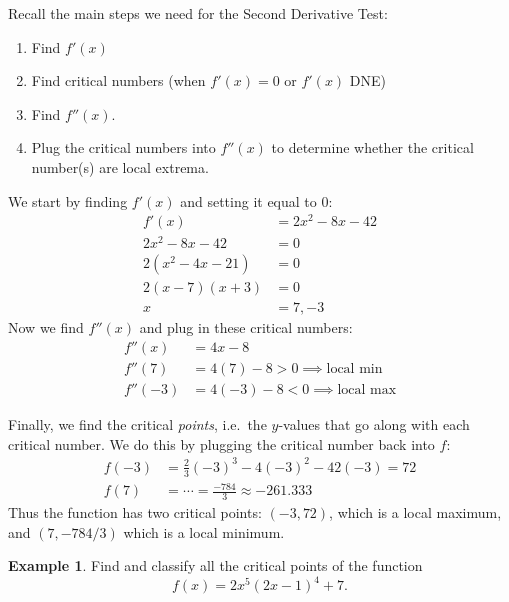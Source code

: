 \documentclass[oneside]{book}
\theoremstyle{definition}
\newtheorem{example}{Example}
\theoremstyle{solution}
\newtheorem*{solution}{Solution}
\newenvironment{solution}{\vspace{2in}\comment}{\endcomment}
\begin{document}
\begin{solution}
Recall the main steps we need for the Second Derivative Test:
\begin{enumerate}
\item Find $f'(x)$
\item Find critical numbers (when $f'(x) = 0$ or $f'(x)$ DNE)
\item Find $f''(x)$.
\item Plug the critical numbers into $f''(x)$ to determine whether the
  critical number(s) are local extrema.
\end{enumerate}

We start by finding $f'(x)$ and setting it equal to $0$:
\begin{align*}
  f'(x) &= 2x^2 - 8x - 42 \\
  2x^2-8x-42 &  =0 \\
  2(x^2-4x-21) & = 0\\
  2(x-7)(x+3)&  =0\\
  x & = 7, -3
\end{align*}
Now we find $f''(x)$ and plug in these critical numbers:
\begin{align*}
  f''(x) & = 4x - 8\\
  f''(7) & = 4(7) - 8 > 0 \implies \text{local min}\\
  f''(-3) & = 4(-3)-8 < 0 \implies \text{local max}
\end{align*}

Finally, we find the critical \emph{points}, i.e.\ the $y$-values that
go along with each critical number.  We do this by plugging the
critical number back into $f$:
\begin{align*}
  f(-3) & = \frac{2}{3}(-3)^3 - 4(-3)^2 - 42(-3) = 72\\
  f(7) & = \cdots = \frac{-784}{3} \approx -261.333
\end{align*}
Thus the function has two critical points: $(-3, 72)$, which is a
local maximum, and $(7,-784/3)$ which is a local minimum.
\end{solution}

\begin{example}
Find and classify all the critical points of the function
$$ 
f(x) = 2x^5(2x-1)^4 + 7. 
$$
\end{example}
\end{document}
